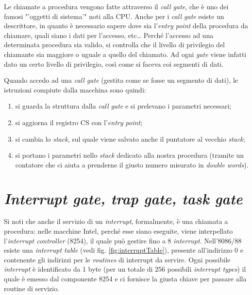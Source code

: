 Le chiamate a procedura vengono fatte attraverso il \textit{call gate}, che è uno dei famosi "'oggetti di sistema'" noti alla CPU. Anche per i \textit{call gate} esiste un descrittore, in quanto è necessario sapere dove sia l'\textit{entry point} della procedura da chiamare, quali siano i dati per l'accesso, etc\ldots
Perché l'accesso ad una determinata procedura sia valido, si controlla che il livello di privilegio del chiamante sia maggiore o uguale a quello del chiamato. Ad ogni \textit{gate} viene infatti dato un certo livello di privilegio, così come si faceva coi segmenti di dati.

Quando accedo ad una \textit{call gate} (gestita come se fosse un segmento di dati), le istruzioni compiute dalla macchina sono quindi:
\begin{enumerate}
\item si guarda la struttura dalla \textit{call gate} e si prelevano i parametri necessari;
\item si aggiorna il registro CS con l'\textit{entry point};
\item si cambia lo \textit{stack}, sul quale viene salvato anche il puntatore al vecchio \textit{stack};
\item si portano i parametri nello \textit{stack} dedicato alla nostra procedura (tramite un contatore che ci aiuta  a prenderne il giusto numero misurato in \textit{double words}).
\end{enumerate}

\section{\textit{Interrupt gate, trap gate, task gate}}
\label{sec:interruptgate}

Si noti che anche il servizio di un \textit{interrupt}, formalmente, è una chiamata a procedura: nelle macchine Intel, perché esse siano eseguite, viene interpellato l'\textit{interrupt controller} (8254), il quale può gestire fino a 8 \textit{interrupt}.
Nell'8086/88 esiste una \textit{interrupt table} (vedi fig. \ref{fig:interruptTable}), presente all'indirizzo 0 e contenente gli indirizzi per le \textit{routines} di interrupt da servire. Ogni possibile \textit{interrupt} è identificato da 1 byte (per un totale di 256 possibili \textit{interrupt types}) il quale è emesso dal componente 8254 e ci fornisce la giusta chiave per passare alla routine di servizio.

